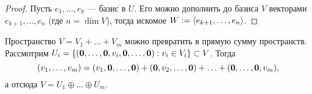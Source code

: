 \begin{proof}
    Пусть $e_1, \ldots, e_k$ --- базис в $U$. Его можно дополнить до базиса $V$ векторами $e_{k + 1}, \ldots, e_n$ (где $n = \dim V$), тогда искомое $W \vcentcolon = \langle e_{k + 1}, \ldots, e_n\rangle$.
\end{proof}

\begin{remark}
    Пространство $V = V_1 + \ldots + V_m$ можно превратить в прямую сумму пространств. Рассмотрим $U_i = \{(\boldsymbol{0}, \ldots, \boldsymbol{0}, v_i, \boldsymbol{0}, \ldots, \boldsymbol{0}) : v_i \in V_i\} \subset V$. Тогда
    \[
        (v_1, \ldots, v_m) = (v_1, \boldsymbol{0}, \ldots, \boldsymbol{0}) + (\boldsymbol{0}, v_2, \ldots, \boldsymbol{0}) + \ldots + (\boldsymbol{0}, \ldots, \boldsymbol{0}, v_m),
    \]
    а отсюда $V = U_1 \oplus \ldots \oplus U_m$.
\end{remark}

